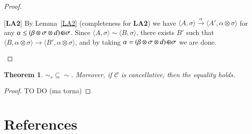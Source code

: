 \documentclass[preprint,12pt]{elsarticle}
\newtheorem{proof}{Proof}
\newtheorem{theorem}{Theorem}
\def\odiv{\, {\ominus\hspace{-7.7pt} \div} \,}
\begin{document}
\begin{proof}
\begin{description}
		\item{[{\bf LA2}]}
		By Lemma~\ref{LA2} (completeness for {\bf LA2}) we have $\langle A,  \sigma \rangle  \xrightarrow{\alpha}\langle A', \alpha \otimes \sigma \rangle$
		for any $\alpha \leq (\beta \otimes \sigma \otimes d) \odiv \sigma$.
		Since $\langle A,\sigma \rangle \sim \langle B,\sigma \rangle$, 
		there exists $B'$ such that 
		$\langle B, \alpha \otimes \sigma \rangle \xrightarrow{} \langle B', \alpha \otimes \sigma \rangle$,
		and by taking $\alpha = (\beta \otimes \sigma \otimes d) \odiv \sigma$ we are done.
	\end{description}
\end{proof}




\begin{theorem}
	$\sim_{\mathit{s}} \subseteq \sim$. Moreover, if $\mathcal{C}$ is cancellative, then the equality holds.
\end{theorem}
\begin{proof} 
	
	TO DO (ma torna)
\end{proof}


\section*{References} \label{}



%
\end{document}
